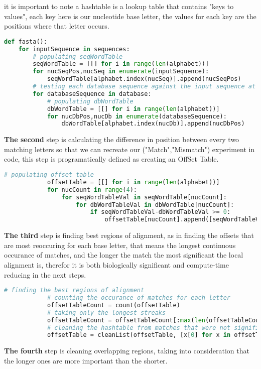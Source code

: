 \documentclass[12pt]{report}
\begin{document}
it is important to note a hashtable is a lookup table that contains "keys to values", each key here is our nucleotide base letter, the values for each key are the positions where that letter occurs.\\
\begin{lstlisting}[language=Python]
def fasta():
	for inputSequence in sequences:
		# populating seqWordTable
		seqWordTable = [[] for i in range(len(alphabet))]
		for nucSeqPos,nucSeq in enumerate(inputSequence):
			seqWordTable[alphabet.index(nucSeq)].append(nucSeqPos)
		# testing each database sequence against the input sequence at hand
		for databaseSequence in database:
			# populating dbWordTable
			dbWordTable = [[] for i in range(len(alphabet))]
			for nucDbPos,nucDb in enumerate(databaseSequence):
				dbWordTable[alphabet.index(nucDb)].append(nucDbPos)
\end{lstlisting}
\textbf{The second} step is calculating the difference in position between every two matching letters so that we can recreate our ("Match","Mismatch") experiment in code, this step is programatically defined as creating an OffSet Table.\\
\begin{lstlisting}[language=Python]
# populating offset table
			offsetTable = [[] for i in range(len(alphabet))]
			for nucCount in range(4):
				for seqWordTableVal in seqWordTable[nucCount]:
					for dbWordTableVal in dbWordTable[nucCount]:
						if seqWordTableVal-dbWordTableVal >= 0:
							offsetTable[nucCount].append([seqWordTableVal-dbWordTableVal,[seqWordTableVal,dbWordTableVal]])
\end{lstlisting}
\newpage
\textbf{The third} step is finding best regions of alignment, as in finding the offsets that are most reoccuring for each base letter, that means the longest continuous occurance of matches, and the longer the match the most significant the local alignment is, therefor it is both biologically significant and compute-time reducing in the next steps.
\begin{lstlisting}[language=Python]
			# finding the best regions of alignment
			# counting the occurance of matches for each letter
			offsetTableCount = count(offsetTable)
			# taking only the longest streaks
			offsetTableCount = offsetTableCount[:max(len(offsetTableCount), 10)]
			# cleaning the hashtable from matches that were not significant
			offsetTable = cleanList(offsetTable, [x[0] for x in offsetTableCount])
\end{lstlisting}
\textbf{The fourth} step is cleaning overlapping regions, taking into consideration that the longer ones are more important than the shorter.\\
\end{document}
